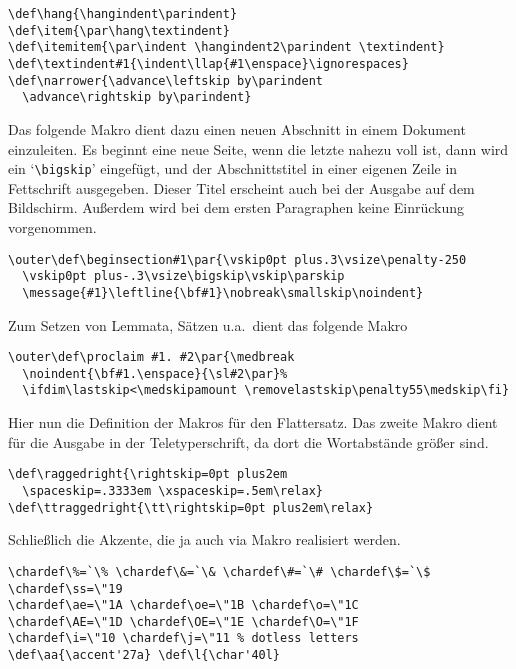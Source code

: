 \begin{appendix}
\begin{verbatim}
\def\hang{\hangindent\parindent}
\def\item{\par\hang\textindent}
\def\itemitem{\par\indent \hangindent2\parindent \textindent}
\def\textindent#1{\indent\llap{#1\enspace}\ignorespaces}
\def\narrower{\advance\leftskip by\parindent
  \advance\rightskip by\parindent}
\end{verbatim}
Das folgende Makro dient dazu einen neuen Abschnitt in einem Dokument
einzuleiten. Es beginnt eine neue Seite, wenn die letzte nahezu voll
ist, dann wird ein `\verb|\bigskip|' eingef\"ugt, und der
Abschnittstitel in einer eigenen Zeile in Fettschrift ausgegeben.
Dieser Titel erscheint auch bei der Ausgabe auf dem 
Bildschirm.
Au\ss{}erdem wird bei dem ersten Paragraphen keine Einr\"uckung vorgenommen.
\begin{verbatim}
\outer\def\beginsection#1\par{\vskip0pt plus.3\vsize\penalty-250
  \vskip0pt plus-.3\vsize\bigskip\vskip\parskip
  \message{#1}\leftline{\bf#1}\nobreak\smallskip\noindent}
\end{verbatim}
Zum Setzen von Lemmata, S\"atzen u.a.\ dient das folgende Makro
\begin{verbatim}
\outer\def\proclaim #1. #2\par{\medbreak
  \noindent{\bf#1.\enspace}{\sl#2\par}%
  \ifdim\lastskip<\medskipamount \removelastskip\penalty55\medskip\fi}
\end{verbatim}
Hier nun die Definition der Makros f\"ur den Flattersatz. Das zweite
Makro dient f\"ur die Ausgabe in der Teletyperschrift, da dort die
Wortabst\"ande gr\"o\ss{}er sind.
\begin{verbatim}
\def\raggedright{\rightskip=0pt plus2em
  \spaceskip=.3333em \xspaceskip=.5em\relax}
\def\ttraggedright{\tt\rightskip=0pt plus2em\relax}
\end{verbatim}
Schlie\ss{}lich die 
Akzente, die ja auch via Makro realisiert werden.
\begin{verbatim}
\chardef\%=`\% \chardef\&=`\& \chardef\#=`\# \chardef\$=`\$
\chardef\ss=\"19
\chardef\ae=\"1A \chardef\oe=\"1B \chardef\o=\"1C
\chardef\AE=\"1D \chardef\OE=\"1E \chardef\O=\"1F
\chardef\i=\"10 \chardef\j=\"11 % dotless letters
\def\aa{\accent'27a} \def\l{\char'40l}
\end{verbatim}
\begin{verbatim}

\end{verbatim}
\end{appendix}

